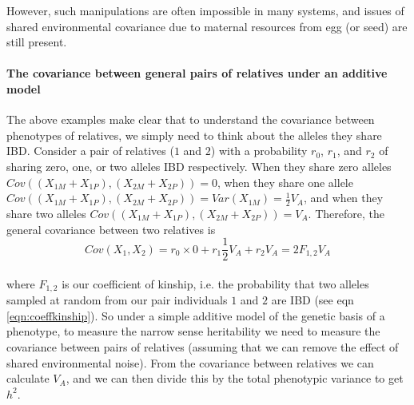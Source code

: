 

However, such manipulations are often
impossible in many systems, and issues of shared environmental
covariance due to maternal resources from egg (or seed) are still present. 



\paragraph{The covariance between general pairs of relatives under an
additive model}

The above examples make clear that to understand the covariance between
phenotypes of relatives, we simply need to think about the alleles they
share IBD. Consider a pair of relatives ($1$ and $2$) with a probability $r_0$,
$r_1$, and $r_2$ of sharing zero, one, or two alleles IBD
respectively. When they share zero alleles
$Cov((X_{1M}+X_{1P}),(X_{2M}+X_{2P}))=0$, when they share one allele
$Cov((X_{1M}+X_{1P}),(X_{2M}+X_{2P}))=
Var(X_{1M})=\frac{1}{2}V_A$, and when they share two alleles $Cov((X_{1M}+X_{1P}),(X_{2M}+X_{2P}))=
V_A$. Therefore, the general covariance between two
relatives is
\begin{equation}
Cov(X_1,X_2) = r_0 \times 0 + r_1 \frac{1}{2}V_A + r_2  V_A =
2 F_{1,2} V_A  \label{additive_covar_general_rellys}
\end{equation}\\
where $F_{1,2}$ is our coefficient of kinship, i.e. the probability that two alleles sampled at random
from our pair
individuals $1$ and $2$ are IBD (see eqn \eqref{eqn:coeffkinship}).
So under a simple additive model of the genetic basis of a phenotype,
to measure the narrow sense heritability we need to measure the
covariance between pairs of relatives (assuming that we can remove the effect of
shared environmental noise). From the covariance between relatives we
can calculate $V_A$, and we can then divide this by the total phenotypic
variance to get $h^2$. \\

